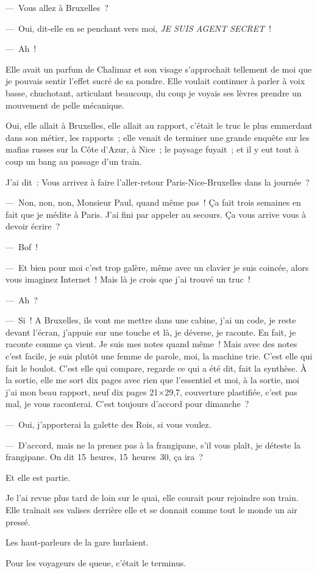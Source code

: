 \documentclass[twoside]{book} %
\begin{document}
— Vous allez à Bruxelles ?\par
— Oui, dit-elle en se penchant vers moi, \emph{JE SUIS AGENT SECRET} !\par
— Ah !\par
Elle avait un parfum de Chalimar et son visage s’approchait tellement de moi que je pouvais sentir l’effet sucré de sa poudre. Elle voulait continuer à parler à voix basse, chuchotant, articulant beaucoup, du coup je voyais ses lèvres prendre un mouvement de pelle mécanique.\par
Oui, elle allait à Bruxelles, elle allait au rapport, c’était le truc le plus emmerdant dans son métier, les rapports ; elle venait de terminer une grande enquête sur les mafias russes sur la Côte d’Azur, à Nice ; le paysage fuyait ; et il y eut tout à coup un bang au passage d’un train.\par
J’ai dit : Vous arrivez à faire l’aller-retour Paris-Nice-Bruxelles dans la journée ?\par
— Non, non, non, Monsieur Paul, quand même pas ! Ça fait trois semaines en fait que je médite à Paris. J’ai fini par appeler au secours. Ça vous arrive vous à devoir écrire ?\par
— Bof !\par
— Et bien pour moi c’est trop galère, même avec un clavier je suis coincée, alors vous imaginez Internet ! Mais là je crois que j’ai trouvé un truc !\par
— Ah ?\par
— Si ! A Bruxelles, ils vont me mettre dans une cabine, j’ai un code, je reste devant l’écran, j’appuie sur une touche et là, je déverse, je raconte. En fait, je raconte comme ça vient. Je suis mes notes quand même ! Mais avec des notes c’est facile, je suis plutôt une femme de parole, moi, la machine trie. C’est elle qui fait le boulot. C’est elle qui compare, regarde ce qui a été dit, fait la synthèse. À la sortie, elle me sort dix pages avec rien que l’essentiel et moi, à la sortie, moi j’ai mon beau rapport, neuf dix pages 21×29,7, couverture plastifiée, c’est pas mal, je vous raconterai. C’est toujours d’accord pour dimanche ?\par
— Oui, j’apporterai la galette des Rois, si vous voulez.\par
— D’accord, mais ne la prenez pas à la frangipane, s’il vous plaît, je déteste la frangipane. On dit 15 heures, 15 heures 30, ça ira ?\par
Et elle est partie.\par
Je l’ai revue plus tard de loin sur le quai, elle courait pour rejoindre son train. Elle traînait ses valises derrière elle et se donnait comme tout le monde un air pressé.\par
Les haut-parleurs de la gare hurlaient.\par
Pour les voyageurs de queue, c’était le terminus.
\end{document}
